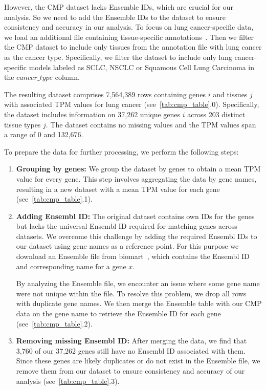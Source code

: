 However, the CMP dataset lacks Ensemble IDs, which are crucial for our analysis.
So we need to add the Ensemble IDs to the dataset to ensure consistency and accuracy in our analysis.
To focus on lung cancer-specific data, we load an additional file containing tissue-specific annotations~\cite{cmp_tissue_models}.
Then we filter the CMP dataset to include only tissues from the annotation file with lung cancer as the cancer type.
Specifically, we filter the dataset to include only lung cancer-specific models labeled as
SCLC, NSCLC or Squamous Cell Lung Carcinoma in the $cancer\_type$ column.

The resulting dataset comprises 7,564,389 rows containing genes $i$ and tissues $j$
with associated TPM values for lung cancer (see~\cref{tab:cmp_table}.0).
Specifically, the dataset includes information on 37,262 unique genes $i$ across 203 distinct tissue types $j$.
The dataset contains no missing values and the TPM values span a range of 0 and 132,676.

To prepare the data for further processing, we perform the following steps:
\begin{enumerate}
    \item \textbf{Grouping by genes:}
    We group the dataset by genes to obtain a mean TPM value for every gene.
    This step involves aggregating the data by gene names, resulting in a new dataset
    with a mean TPM value for each gene (see~\cref{tab:cmp_table}.1).

    \item \textbf{Adding Ensembl ID:}
    The original dataset contains own IDs for the genes but lacks the universal Ensembl ID required for matching genes across datasets.
    We overcome this challenge by adding the required Ensembl IDs to our dataset using gene names as a reference point.
    For this purpose we download an Ensemble file from biomart~\cite{bio_marts},
    which contains the Ensembl ID and corresponding name for a gene $x$.

    By analyzing the Ensemble file, we encounter an issue where some gene name were not unique within the file.
    To resolve this problem, we drop all rows with duplicate gene names.
    We then merge the Ensemble table with our CMP data on the gene name to retrieve the Ensemble ID for each gene (see~\cref{tab:cmp_table}.2).

    \item \textbf{Removing missing Ensembl ID:}
    After merging the data, we find that 3,760 of our 37,262 genes still have no Ensembl ID associated with them.
    Since these genes are likely duplicates or do not exist in the Ensemble file,
    we remove them from our dataset to ensure consistency and accuracy of our analysis (see~\cref{tab:cmp_table}.3).
\end{enumerate}

